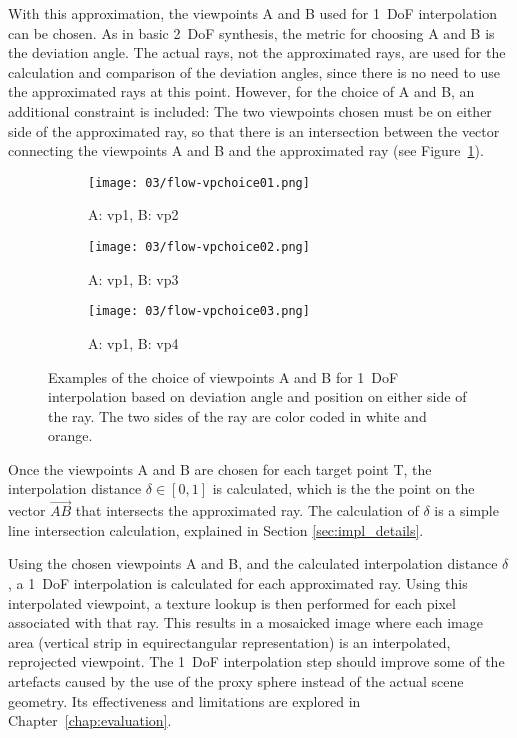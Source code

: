 With this approximation, the viewpoints A and B used for 1~DoF interpolation can be chosen. As in basic 2~DoF synthesis, the metric for choosing A and B is the deviation angle. The actual rays, not the approximated rays, are used for the calculation and comparison of the deviation angles, since there is no need to use the approximated rays at this point. However, for the choice of A and B, an additional constraint is included: The two viewpoints chosen must be on either side of the approximated ray, so that there is an intersection between the vector connecting the viewpoints A and B and the approximated ray (see Figure~\ref{fig:flow_vpchoice}).

\begin{figure}
\centering
    \hfill
    \begin{subfigure}[t]{0.3\textwidth}
            \centering
            \texttt{[image: 03/flow-vpchoice01.png]}
            \caption{A: vp1, B: vp2}
    \end{subfigure}%
    \hfill
    \begin{subfigure}[t]{0.3\textwidth}
            \centering
            \texttt{[image: 03/flow-vpchoice02.png]}
            \caption{A: vp1, B: vp3}
    \end{subfigure}
    \hfill
    \begin{subfigure}[t]{0.3\textwidth}
            \centering
            \texttt{[image: 03/flow-vpchoice03.png]}
            \caption{A: vp1, B: vp4}
    \end{subfigure}%
    \hfill
    \hfill
  \caption[Examples of the choice of viewpoints A and B for 1~DoF interpolation]{Examples of the choice of viewpoints A and B for 1~DoF interpolation based on deviation angle and position on either side of the ray. The two sides of the ray are color coded in white and orange.} \label{fig:flow_vpchoice}
\end{figure}

Once the viewpoints A and B are chosen for each target point T, the interpolation distance $\delta \in [0,1]$ is calculated, which is the the point on the vector $\overrightarrow{AB}$ that intersects the approximated ray. The calculation of $\delta$ is a simple line intersection calculation, explained in Section \ref{sec:impl_details}.

Using the chosen viewpoints A and B, and the calculated interpolation distance $\delta$, a 1~DoF interpolation is calculated for each approximated ray. Using this interpolated viewpoint, a texture lookup is then performed for each pixel associated with that ray. This results in a mosaicked image where each image area (vertical strip in equirectangular representation) is an interpolated, reprojected viewpoint. The 1~DoF interpolation step should improve some of the artefacts caused by the use of the proxy sphere instead of the actual scene geometry. Its effectiveness and limitations are explored in Chapter~\ref{chap:evaluation}.

